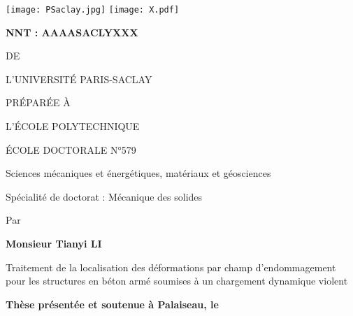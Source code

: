 
\begin{titlepage}

\begin{flushleft}
\texttt{[image: PSaclay.jpg]} \hfill
\texttt{[image: X.pdf]}
\end{flushleft}
\vspace{10pt}

\begin{framed}
\begin{flushleft}
\large\textbf{NNT : AAAASACLYXXX}
\end{flushleft}
\vspace{20pt}

\begin{center}
{\color{color02}{\LARGE THÈSE DE DOCTORAT}

\vspace{8pt}
{\LARGE DE}

\vspace{8pt}
{\LARGE L'UNIVERSITÉ PARIS-SACLAY}

\vspace{8pt}
{\LARGE PRÉPARÉE À}

\vspace{8pt}
{\LARGE L'ÉCOLE POLYTECHNIQUE}}

\vspace{24pt}
{\Large ÉCOLE DOCTORALE N°579}

\vspace{5pt}
{\Large Sciences mécaniques et énergétiques, matériaux et géosciences}

\vspace{16pt}
{\Large Spécialité de doctorat : Mécanique des solides}
\vspace{12pt}

{\large Par}
\vspace{12pt}

{\Large\bfseries Monsieur Tianyi LI}
\vspace{20pt}

{\huge
Traitement de la localisation des déformations par champ d'endommagement pour les structures en béton armé soumises à un chargement dynamique violent}
\end{center}

\vfill
\begin{flushleft}
\large
\textbf{Thèse présentée et soutenue à Palaiseau, le}
\vspace{15pt}


\end{flushleft}
\end{framed}
\end{titlepage}
